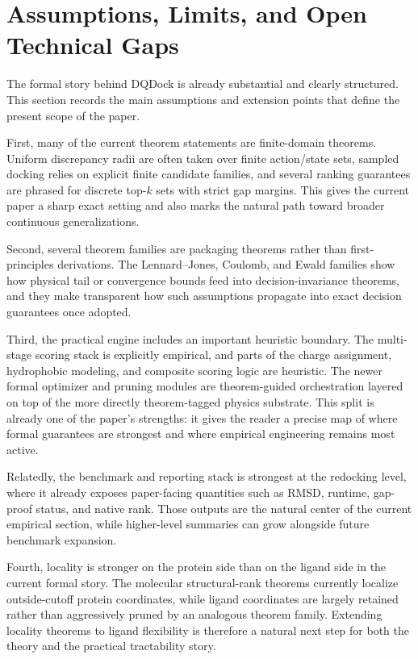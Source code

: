\section{Assumptions, Limits, and Open Technical Gaps}\label{sec:limitations}

The formal story behind DQDock is already substantial and clearly structured. This section records the main assumptions and extension points that define the present scope of the paper.

First, many of the current theorem statements are finite-domain theorems. Uniform discrepancy radii are often taken over finite action/state sets, sampled docking relies on explicit finite candidate families, and several ranking guarantees are phrased for discrete top-$k$ sets with strict gap margins. This gives the current paper a sharp exact setting and also marks the natural path toward broader continuous generalizations.

Second, several theorem families are packaging theorems rather than first-principles derivations. The Lennard--Jones, Coulomb, and Ewald families show how physical tail or convergence bounds feed into decision-invariance theorems, and they make transparent how such assumptions propagate into exact decision guarantees once adopted.

Third, the practical engine includes an important heuristic boundary. The multi-stage scoring stack is explicitly empirical, and parts of the charge assignment, hydrophobic modeling, and composite scoring logic are heuristic. The newer formal optimizer and pruning modules are theorem-guided orchestration layered on top of the more directly theorem-tagged physics substrate. This split is already one of the paper's strengths: it gives the reader a precise map of where formal guarantees are strongest and where empirical engineering remains most active.

Relatedly, the benchmark and reporting stack is strongest at the redocking level, where it already exposes paper-facing quantities such as RMSD, runtime, gap-proof status, and native rank. Those outputs are the natural center of the current empirical section, while higher-level summaries can grow alongside future benchmark expansion.

Fourth, locality is stronger on the protein side than on the ligand side in the current formal story. The molecular structural-rank theorems currently localize outside-cutoff protein coordinates, while ligand coordinates are largely retained rather than aggressively pruned by an analogous theorem family. Extending locality theorems to ligand flexibility is therefore a natural next step for both the theory and the practical tractability story.

